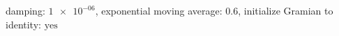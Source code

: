 damping: $\num[scientific-notation=true]{1e-06}$, exponential moving average: $\num[scientific-notation=true]{0.6}$, initialize Gramian to identity: $\text{yes}$